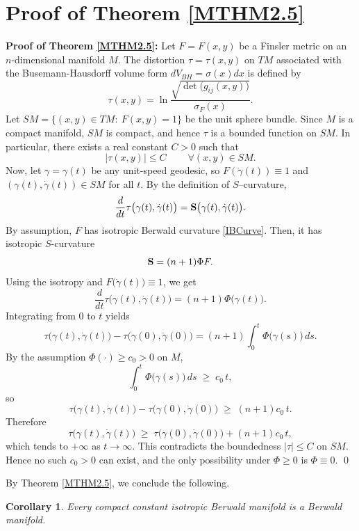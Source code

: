\documentclass[12pt,a4paper]{article}
\newtheorem{cor}{Corollary}[section]
\theoremstyle{definition}
\numberwithin{equation}{section}
\begin{document}
\section{Proof of Theorem \ref{MTHM2.5}}
\bigskip
\noindent
{\bf Proof of Theorem \ref{MTHM2.5}:} Let $F=F(x,y)$ be a Finsler metric on an $n$-dimensional manifold $M$. The distortion $\tau =\tau(x,y) $ on $TM$
associated with the  Busemann-Hausdorff volume form $dV_{BH}=\sigma(x) dx$ is defined by
\[
\tau  (x,y) = \ln \frac{ \sqrt{ \det \big(g_{ij}(x,y)\big) }}{ \sigma_F(x) }.
\]
Let $SM=\Big\{(x,y)\in TM:\ F(x,y)=1\Big\}$ be the unit sphere bundle. Since $M$ is a compact manifold,
$SM$ is compact, and hence $\tau$ is a bounded function on $SM$. In particular, there exists a real constant
$C>0$ such that
\[
|\tau(x,y)|\le C \qquad  \ \forall(x,y)\in SM.
\]
Now, let $\gamma=\gamma(t)$ be any unit-speed geodesic, so $F(\dot\gamma(t))\equiv 1$ and
$(\gamma(t),\dot\gamma(t))\in SM$ for all $t$. By the definition of $S$--curvature,
\[
\frac{d}{dt}\tau\big(\gamma(t),\dot\gamma(t)\big)={\bf S}\big(\gamma(t),\dot\gamma(t)\big).
\]
By assumption, $F$  has isotropic Berwald curvature \eqref{IBCurve}. Then, it has isotropic $S$-curvature
\[
{\bf S}=(n+1)\Phi F.
\]
Using the isotropy and $F\big(\dot\gamma(t)\big)\equiv 1$, we get
\[
\frac{d}{dt}\tau\big(\gamma(t),\dot\gamma(t)\big)= (n+1)\Phi\big(\gamma(t)\big).
\]
Integrating from $0$ to $t$ yields
\[
\tau\big(\gamma(t),\dot\gamma(t)\big)-\tau\big(\gamma(0),\dot\gamma(0)\big)= (n+1)\int_0^t \Phi\big(\gamma(s)\big)\,ds.
\]
By the assumption $\Phi(\cdot)\ge c_0>0$ on $M$,
\[
\int_0^t \Phi\big(\gamma(s)\big)\,ds \;\ge\; c_0\,t,
\]
so
\[
\tau\big(\gamma(t),\dot\gamma(t)\big)-\tau\big(\gamma(0),\dot\gamma(0)\big)\;\ge\; (n+1)c_0\,t.
\]
Therefore
\[
\tau\big(\gamma(t),\dot\gamma(t)\big) \;\ge\; \tau\big(\gamma(0),\dot\gamma(0)\big) + (n+1)c_0\,t,
\]
which tends to $+\infty$ as $t\to\infty$. This contradicts the boundedness
$|\tau|\le C$ on $SM$. Hence no such $c_0>0$ can exist, and the only possibility
under $\Phi\ge 0$ is $\Phi\equiv 0$.
\qed

\bigskip
By  Theorem \ref{MTHM2.5}, we conclude the following.
\begin{cor}
Every compact  constant isotropic Berwald manifold is a Berwald manifold.
\end{cor}
\end{document}
